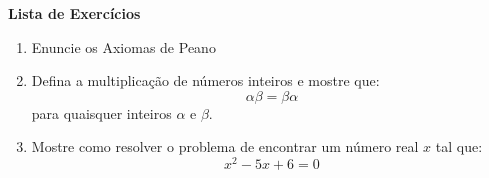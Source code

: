 \documentclass[12pt]{article}
\begin{document}
\textbf{Lista de Exercícios}

\begin{enumerate}
    \item Enuncie os Axiomas de Peano

    \item Defina a multiplicação de números inteiros e mostre que:
          \begin{equation}
              \alpha\beta=\beta\alpha
          \end{equation}
          para quaisquer inteiros $\alpha$ e $\beta$.

    \item Mostre como resolver o problema de encontrar um número real $x$ tal que:
          \begin{equation}
              x^2 - 5x + 6 = 0
          \end{equation}
\end{enumerate}
\end{document}
